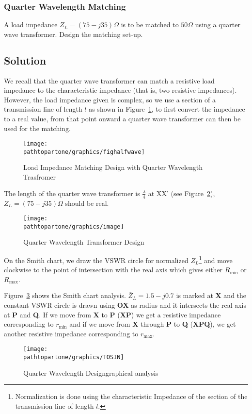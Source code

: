 \begin{exmp}
\subsubsection*{Quarter Wavelength Matching}
A load impedance $Z_{L}=(75-j35)\varOmega$ is to be matched to $50\varOmega$ using a quarter wave transformer. Design the matching set-up. 

\subsection*{Solution}
We recall that the quarter wave transformer can match a resistive load impedance to the characteristic impedance (that is, two resistive impedances). However, the load impedance given is complex, so we use a section of a transmission line of length $l$ as shown in Figure~\ref{fig;fighalfwave}, to first convert the impedance to a real value, from that point onward a quarter wave transformer can then be used for the matching.
\begin{figure}[h]
\centering
\texttt{[image: \\pathtopartone/graphics/fighalfwave]}
\caption{Load Impedance Matching Design with Quarter Wavelength Trasfromer}
\label{fig;fighalfwave}
\end{figure}

The length of the quarter wave transformer is $\frac{\lambda}{4}$ at XX' (see Figure~\ref{fig:image}), $Z_L = (75-j35)\varOmega$ should be real.
\begin{figure}[h]
\centering
\texttt{[image: \\pathtopartone/graphics/image]}
\caption{Quarter Wavelength Transformer Design}
\label{fig:image}
\end{figure}

On the Smith chart, we draw the VSWR circle for normalized $Z_{L}$\footnote{
Normalization is done using the characteristic Impedance of the section of the transmission line of length $l$.
} and move clockwise to the point of intersection with the real axis which gives either $R_\min$ or $R_\max$.

Figure~\ref{fig:tosin} shows the Smith chart analysis. $\bar{Z}_L=1.5-j0.7$ is marked at \textbf{X} and the constant VSWR circle is drawn using \textbf{OX} as radius and it intersects the real axis at \textbf{P} and \textbf{Q}. If we move from \textbf{X} to \textbf{P} (\textbf{XP}) we get a resistive impedance corresponding to $r_\min$ and if we move from \textbf{X} through \textbf{P} to \textbf{Q} (\textbf{XPQ}), we get another resistive impedance corresponding to $r_\max$.
\begin{figure}[h]
\centering
\texttt{[image: \\pathtopartone/graphics/TOSIN]}
\caption{Quarter Wavelength Design\textemdash\;graphical analysis}
\label{fig:tosin}
\end{figure}


\end{exmp}
